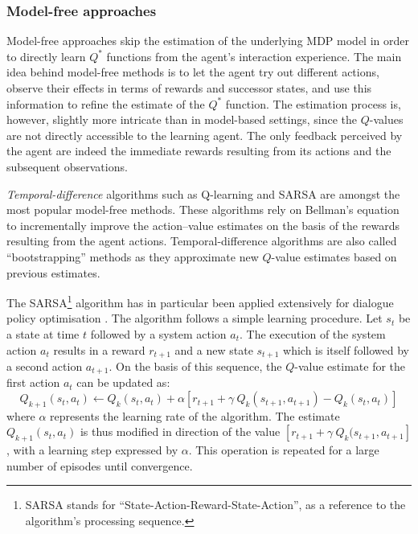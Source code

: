 \subsubsection{Model-free approaches}

Model-free approaches skip the estimation of the underlying MDP model in order to directly learn $Q^*$ functions from the agent's interaction experience.  The main idea behind model-free methods is to let the agent try out different actions, observe their effects in terms of rewards and successor states, and use this information to refine the estimate of the $Q^*$ function. The estimation process is, however, slightly more intricate than in model-based settings, since the $Q$-values are not directly accessible to the learning agent.  The only feedback perceived by the agent are indeed the immediate rewards resulting from its actions and the subsequent observations.

\textit{Temporal-difference} algorithms such as Q-learning \citep{watkins92} and SARSA \citep{rummery:phd95} are amongst the most popular model-free methods. These algorithms rely on Bellman's equation to incrementally improve the action--value estimates on the basis of the rewards resulting from the agent actions. Temporal-difference algorithms are also called ``bootstrapping'' methods as they approximate new $Q$-value estimates based on previous estimates. 

The SARSA\footnote{SARSA stands for ``State-Action-Reward-State-Action'', as a reference to the algorithm's processing sequence.} algorithm has in particular been applied extensively for dialogue policy optimisation \citep{RieserLemon11}.  The algorithm follows a simple learning procedure. Let $s_t$ be a state at time $t$ followed by a system action $a_t$. The execution of the system action $a_t$ results in a reward $r_{t+1}$ and a new state $s_{t+1}$ which is itself followed by a second action $a_{t+1}$.  On the basis of this sequence, the $Q$-value estimate for the first action $a_t$ can be updated as:
\begin{equation}
Q_{k+1}(s_t, a_t) \leftarrow Q_{k}(s_t,a_t) + \alpha \left[r_{t+1} + \gamma \ Q_{k}(s_{t+1}, a_{t+1}) - Q_{k}(s_t, a_t) \right] \label{eq:sarsa}
\end{equation}
where $\alpha$ represents the learning rate of the algorithm. The estimate $Q_{k+1}(s_t, a_t)$ is thus modified in direction of the value $ \left[r_{t+1} + \gamma \ Q_{k}(s_{t+1}, a_{t+1} \right]$, with a learning step expressed by $\alpha$. This operation is repeated for a large number of episodes until convergence.  

